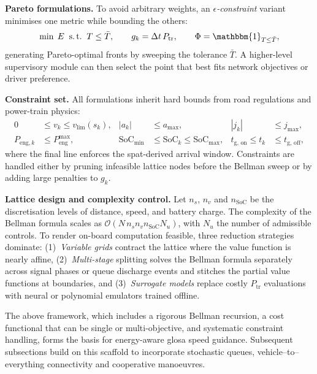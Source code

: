 \textbf{Pareto formulations.}
To avoid arbitrary weights, an \emph{$\epsilon$-constraint} variant minimises one metric while bounding the others:
\begin{equation*}
    \min\;E \;\;\text{s.\,t.}\;\;T \le \bar T, \qquad
    g_k = \Delta t\,P_{\text{tr}}, \qquad
    \Phi = \mathbbm{1}_{T \le \bar T},
\end{equation*}
generating Pareto-optimal fronts by sweeping the tolerance $\bar T$. A higher-level supervisory module can then select the point that best fits network objectives or driver preference.

\textbf{Constraint set.}
All formulations inherit hard bounds from road regulations and power-train physics:
\begin{align*}
0 &\le v_k\le v_{\mathrm{lim}}(s_k), &
|a_k| &\le a_{\max}, &
|j_k| &\le j_{\max}, \nonumber\\
P_{\text{eng},k} &\le P_{\text{eng}}^{\max}, &
\mathrm{SoC}_{\min} &\le \mathrm{SoC}_k\le \mathrm{SoC}_{\max}, &
t_{\mathrm{g,\,on}}\le t_k &\le t_{\mathrm{g,\,off}},
\end{align*}
where the final line enforces the \ac{spat}-derived arrival window. Constraints are handled either by pruning infeasible lattice nodes before the Bellman sweep or by adding large penalties to $g_k$.

\textbf{Lattice design and complexity control.}
Let $n_s$, $n_v$ and $n_{\mathrm{SoC}}$ be the discretisation levels of distance, speed, and battery charge. The complexity of the Bellman formula scales as $\mathcal O(N\,n_s n_v n_{\mathrm{SoC}} N_u)$, with $N_u$ the number of admissible controls. To render on-board computation feasible, three reduction strategies dominate:  
(1)~\textit{Variable grids} contract the lattice where the value function is nearly affine,  
(2)~\textit{Multi-stage} splitting solves the Bellman formula separately across signal phases or queue discharge events and stitches the partial value functions at boundaries, and  
(3)~\textit{Surrogate models} replace costly $P_{\text{tr}}$ evaluations with neural or polynomial emulators trained offline.

The above framework, which includes a rigorous Bellman recursion, a cost functional that can be single or multi-objective, and systematic constraint handling, forms the basis for energy-aware \ac{glosa} speed guidance. Subsequent subsections build on this scaffold to incorporate stochastic queues, vehicle–to–everything connectivity and cooperative manoeuvres.

